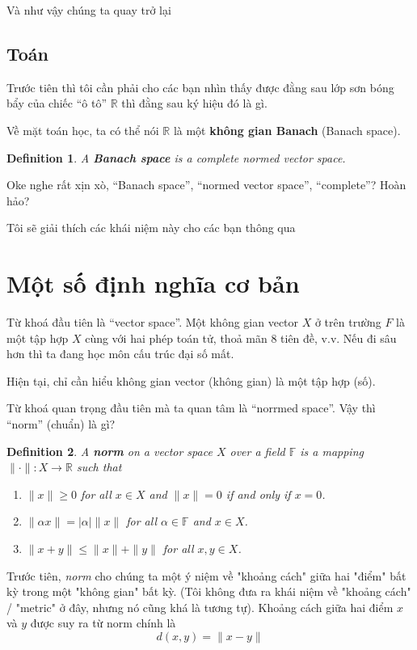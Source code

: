 \documentclass[a4paper,12pt]{article}
\newtheorem{definition}{Definition}[section]
\newenvironment{fdefinition}
  {\begin{mdframed}\begin{definition}}
  {\end{definition}\end{mdframed}}
\begin{document}
Và như vậy chúng ta quay trở lại

\subsection*{Toán}
Trước tiên thì tôi cần phải cho các bạn nhìn thấy được đằng sau lớp sơn bóng bẩy của chiếc
``ô tô'' \(\mathbb{R}\) thì đằng sau ký hiệu đó là gì.

Về mặt toán học, ta có thể nói \(\mathbb{R}\) là một \textbf{không gian Banach} (Banach space).

\begin{fdefinition}
  A \textbf{Banach space} is a complete normed vector space.
\end{fdefinition}

Oke nghe rất xịn xò, ``Banach space'', ``normed vector space'', ``complete''? Hoàn hảo?

Tôi sẽ giải thích các khái niệm này cho các bạn thông qua

\section{Một số định nghĩa cơ bản}

Từ khoá đầu tiên là ``vector space''. Một không gian vector \(X\) ở trên trường \(F\) là một
tập hợp \(X\) cùng với hai phép toán tử, thoả mãn 8 tiên đề, v.v. Nếu đi sâu hơn thì ta
đang học môn cấu trúc đại số mất.

Hiện tại, chỉ cần hiểu không gian vector (không gian) là một tập hợp (số).

Từ khoá quan trọng đầu tiên mà ta quan tâm là ``norrmed space''.
Vậy thì ``norm'' (chuẩn) là gì?

\begin{fdefinition}
  A \textbf{norm} on a vector space \(X\) over a field \(\mathbb{F}\) is a mapping \(\| \cdot \|: X \to \mathbb{R}\) such that
  \begin{enumerate}
    \item $\| x \| \geq 0$ for all $x \in X$ and $\| x \| = 0$ if and only if $x = 0$.
    \item $\| \alpha x \| = |\alpha| \| x \|$ for all $\alpha \in \mathbb{F}$ and $x \in X$.
    \item $\| x + y \| \leq \| x \| + \| y \|$ for all $x, y \in X$.
  \end{enumerate}
\end{fdefinition}

Trước tiên, \emph{norm} cho chúng ta một ý niệm về "khoảng cách" giữa hai "điểm" bất kỳ
trong một "không gian" bất kỳ. (Tôi không đưa ra khái niệm về "khoảng cách" / "metric" ở đây,
nhưng nó cũng khá là tương tự). Khoảng cách giữa hai điểm \(x\) và \(y\) được suy ra từ norm
chính là
\[
  d(x, y) = \| x - y \|
\]
\end{document}
